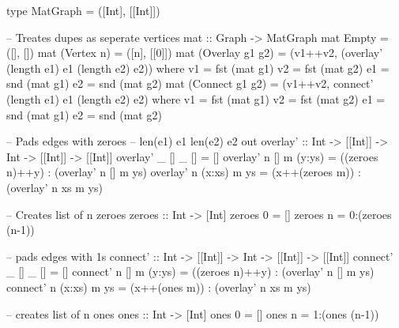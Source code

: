 \documentclass[11pt,a4paper]{article}
\begin{document}
\codesol
\ifsolutions
\begin{code}
type MatGraph = ([Int], [[Int]])

-- Treates dupes as seperate vertices
mat :: Graph -> MatGraph
mat Empty = ([], [])
mat (Vertex n) = ([n], [[0]])
mat (Overlay g1 g2) = (v1++v2, (overlay' (length e1) e1 (length e2) e2))
  where
    v1 = fst (mat g1)
    v2 = fst (mat g2)
    e1 = snd (mat g1)
    e2 = snd (mat g2)
mat (Connect g1 g2) = (v1++v2, connect' (length e1) e1 (length e2) e2)
  where
    v1 = fst (mat g1)
    v2 = fst (mat g2)
    e1 = snd (mat g1)
    e2 = snd (mat g2)

-- Pads edges with zeroes
--          len(e1)   e1     len(e2)    e2          out
overlay' :: Int -> [[Int]] -> Int -> [[Int]] -> [[Int]]
overlay' _ [] _ [] = []
overlay' n [] m (y:ys) = ((zeroes n)++y) : (overlay' n [] m ys)
overlay' n (x:xs) m ys = (x++(zeroes m)) : (overlay' n xs m ys)

-- Creates list of n zeroes
zeroes :: Int -> [Int]
zeroes 0 = []
zeroes n = 0:(zeroes (n-1))

-- pads edges with 1s
connect' :: Int -> [[Int]] -> Int -> [[Int]] -> [[Int]]
connect' _ [] _ [] = []
connect' n [] m (y:ys) = ((zeroes n)++y) : (overlay' n [] m ys)
connect' n (x:xs) m ys = (x++(ones m)) : (overlay' n xs m ys)

-- creates list of n ones
ones :: Int -> [Int]
ones 0 = []
ones n = 1:(ones (n-1))
\end{code}
\fi
\end{document}
